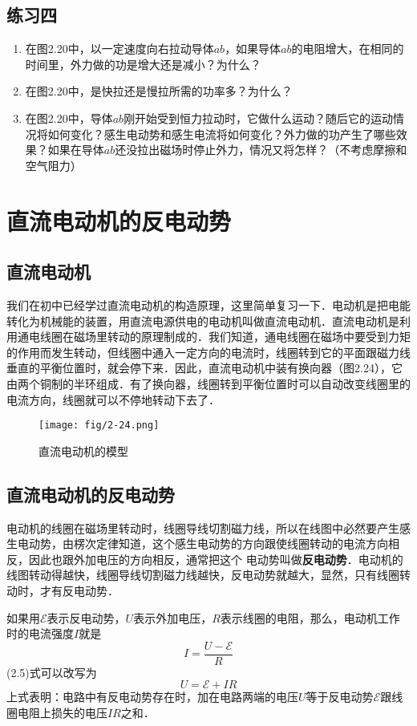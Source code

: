 \subsection*{练习四}
\begin{enumerate}
    \item 在图2.20中，以一定速度向右拉动导体$ab$，如果导体$ab$的电阻增大，在相同的时间里，外力做的功是增大还是减小？为什么？
    \item 在图2.20中，是快拉还是慢拉所需的功率多？为什么？
    \item 在图2.20中，导体$ab$刚开始受到恒力拉动时，它做什么运动？随后它的运动情况将如何变化？感生电动势和感生电流将如何变化？外力做的功产生了哪些效果？如果在导体$ab$还没拉出磁场时停止外力，情况又将怎样？（不考虑摩擦和空气阻力）
\end{enumerate}

\section{直流电动机的反电动势}
\subsection{直流电动机}

我们在初中已经学过直流电动机的构造原理，这里简单复习一下．电动机是把电能转化为机械能的装置，用直流电源供电的电动机叫做直流电动机．直流电动机是利用通电线圈在磁场里转动的原理制成的．我们知道，通电线圈在磁场中要受到力矩的作用而发生转动，但线圈中通入一定方向的电流时，线圈转到它的平面跟磁力线垂直的平衡位置时，就会停下来．因此，直流电动机中装有换向器（图2.24），它由两个铜制的半环组成．有了换向器，线圈转到平衡位置时可以自动改变线圈里的电流方向，线圈就可以不停地转动下去了．
\begin{figure}[htp]\centering
\texttt{[image: fig/2-24.png]}
\caption{直流电动机的模型}
\end{figure}

\subsection{直流电动机的反电动势}

电动机的线圈在磁场里转动时，线圈导线切割磁力线，所以在线图中必然要产生感生电动势，由楞次定律知道，这个感生电动势的方向跟使线圈转动的电流方向相反，因此也跟外加电压的方向相反，通常把这个
电动势叫做\textbf{反电动势}．电动机的线图转动得越快，线圈导线切割磁力线越快，反电动势就越大，显然，只有线圈转动时，才有反电动势．

如果用$\mathcal{E}$表示反电动势，$U$表示外加电压，$R$表示线圈的电阻，那么，电动机工作时的电流强度$I$就是
\begin{equation}
    I=\frac{U-\mathcal{E}}{R}
\end{equation}
(2.5)式可以改写为
\begin{equation}
    U=\mathcal{E}+IR
\end{equation}
上式表明：电路中有反电动势存在时，加在电路两端的电压$U$等于反电动势$\mathcal{E}$跟线圈电阻上损失的电压$IR$之和．

